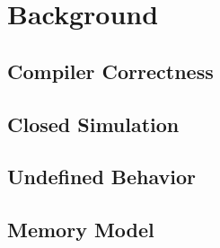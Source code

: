 \section{Background}
\label{sec:background}

\subsection{Compiler Correctness}
\subsection{Closed Simulation}
\subsection{Undefined Behavior}
\subsection{Memory Model}






